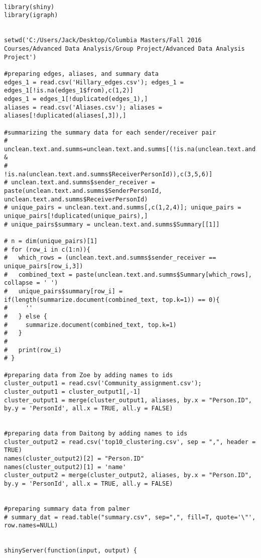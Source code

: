 \begin{verbatim}

library(shiny)
library(igraph)


setwd('C:/Users/Jack/Desktop/Columbia Masters/Fall 2016 Courses/Advanced Data Analysis/Group Project/Advanced Data Analysis Project')

#preparing edges, aliases, and summary data
edges_1 = read.csv('Hillary_edges.csv'); edges_1 = edges_1[!is.na(edges_1$from),c(1,2)]
edges_1 = edges_1[!duplicated(edges_1),]
aliases = read.csv('Aliases.csv'); aliases = aliases[!duplicated(aliases[,3]),]

#summarizing the summary data for each sender/receiver pair
# unclean.text.and.summs=unclean.text.and.summs[(!is.na(unclean.text.and.summs$SenderPersonId) & 
#                                                 !is.na(unclean.text.and.summs$ReceiverPersonId)),c(3,5,6)]
# unclean.text.and.summs$sender_receiver = paste(unclean.text.and.summs$SenderPersonId, unclean.text.and.summs$ReceiverPersonId)
# unique_pairs = unclean.text.and.summs[,c(1,2,4)]; unique_pairs = unique_pairs[!duplicated(unique_pairs),]
# unique_pairs$summary = unclean.text.and.summs$Summary[[1]]

# n = dim(unique_pairs)[1]
# for (row_i in c(1:n)){
#   which_rows = (unclean.text.and.summs$sender_receiver == unique_pairs[row_i,3])
#   combined_text = paste(unclean.text.and.summs$Summary[which_rows], collapse = ' ')
#   unique_pairs$summary[row_i] = if(length(summarize.document(combined_text, top.k=1)) == 0){
#     ''
#   } else {
#     summarize.document(combined_text, top.k=1)
#   }
# 
#   print(row_i)
# }

#preparing data from Zoe by adding names to ids
cluster_output1 = read.csv('Community_assignment.csv'); cluster_output1 = cluster_output1[,-1]
cluster_output1 = merge(cluster_output1, aliases, by.x = "Person.ID", by.y = 'PersonId', all.x = TRUE, all.y = FALSE)


#preparing data from Daitong by adding names to ids
cluster_output2 = read.csv('top10_clustering.csv', sep = ",", header = TRUE)
names(cluster_output2)[2] = "Person.ID"
names(cluster_output2)[1] = 'name'
cluster_output2 = merge(cluster_output2, aliases, by.x = "Person.ID", by.y = 'PersonId', all.x = TRUE, all.y = FALSE)


#preparing summary data from palmer
# summary_dat = read.table("summary.csv", sep=",", fill=T, quote='\"', row.names=NULL)


shinyServer(function(input, output) {



\end{verbatim}
